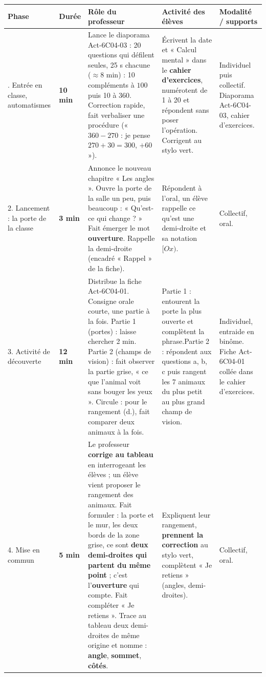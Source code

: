 \documentclass[11pt]{article}
\newcommand{\minutes}[1]{\textbf{#1 min}}
\begin{document}
\renewcommand{\arraystretch}{1.05}
\small
\begin{tabularx}{\linewidth}{|>{\raggedright\arraybackslash}p{2.1cm}|>{\centering\arraybackslash}p{0.9cm}|X|X|>{\raggedright\arraybackslash}p{2cm}|}
\hline
\textbf{Phase} & \textbf{Durée} & \textbf{Rôle du professeur} & \textbf{Activité des élèves} & \textbf{Modalité / supports} \\ \hline

1. Entrée en classe, automatismes &
\minutes{10} &
Lance le diaporama Act-6C04-03 : 20 questions qui défilent seules, 25 s chacune ($\approx 8$ min) : 10 compléments à $100$ puis 10 à $360$. Correction rapide, fait verbaliser une procédure (« $360 - 270$ : je pense $270 + 30 = 300$, $+ 60$ »). &
Écrivent la date et « Calcul mental » dans le \textbf{cahier d'exercices}, numérotent de 1 à 20 et répondent sans poser l'opération. Corrigent au stylo vert. &
Individuel puis collectif. Diaporama Act-6C04-03, cahier d'exercices. \\ \hline

2. Lancement : la porte de la classe &
\minutes{3} &
Annonce le nouveau chapitre « Les angles ». Ouvre la porte de la salle un peu, puis beaucoup : « Qu'est-ce qui change ? » Fait émerger le mot \textbf{ouverture}. Rappelle la demi-droite (encadré « Rappel » de la fiche). &
Répondent à l'oral, un élève rappelle ce qu'est une demi-droite et sa notation $[Ox)$. &
Collectif, oral. \\ \hline

3. Activité de découverte &
\minutes{12} &
Distribue la fiche Act-6C04-01. Consigne orale courte, une partie à la fois. Partie 1 (portes) : laisse chercher 2 min. Partie 2 (champs de vision) : fait observer la partie grise, « ce que l'animal voit sans bouger les yeux ». Circule : pour le rangement (d.), fait comparer deux animaux à la fois. &
Partie 1 : entourent la porte la plus ouverte et complètent la phrase.\newline Partie 2 : répondent aux questions a, b, c puis rangent les 7 animaux du plus petit au plus grand champ de vision. &
Individuel, entraide en binôme. Fiche Act-6C04-01 collée dans le cahier d'exercices. \\ \hline

4. Mise en commun &
\minutes{5} &
Le professeur \textbf{corrige au tableau} en interrogeant les élèves ; un élève vient proposer le rangement des animaux. Fait formuler : la porte et le mur, les deux bords de la zone grise, ce sont \textbf{deux demi-droites qui partent du même point} ; c'est l'\textbf{ouverture} qui compte. Fait compléter « Je retiens ». Trace au tableau deux demi-droites de même origine et nomme : \textbf{angle}, \textbf{sommet}, \textbf{côtés}. &
Expliquent leur rangement, \textbf{prennent la correction} au stylo vert, complètent « Je retiens » (angles, demi-droites). &
Collectif, oral. \\ \hline


\end{tabularx}
\end{document}
